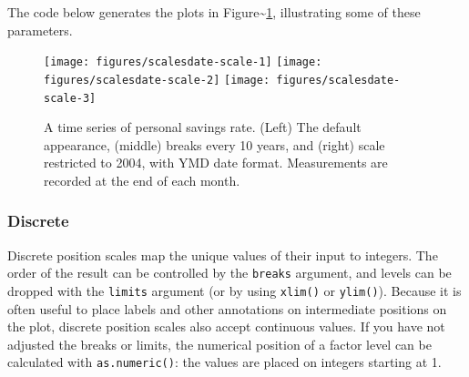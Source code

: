 The code below generates the plots in
Figure\textasciitilde{}\ref{fig:date-scale}, illustrating some of these
parameters.

\begin{Shaded}
\end{Shaded}

\begin{figure}
\texttt{[image: figures/scalesdate-scale-1]} \texttt{[image: figures/scalesdate-scale-2]} \texttt{[image: figures/scalesdate-scale-3]} \caption{A time series of personal savings rate. (Left) The default appearance, (middle) breaks every 10 years, and (right) scale restricted to 2004, with YMD date format. Measurements are recorded at the end of each month.\label{fig:date-scale}}
\end{figure}

\subsubsection{Discrete}\label{ssub:scale-discrete}

Discrete position scales map the unique values of their input to
integers. The order of the result can be controlled by the
\texttt{breaks} argument, and levels can be dropped with the
\texttt{limits} argument (or by using \texttt{xlim()} or
\texttt{ylim()}). Because it is often useful to place labels and other
annotations on intermediate positions on the plot, discrete position
scales also accept continuous values. If you have not adjusted the
breaks or limits, the numerical position of a factor level can be
calculated with \texttt{as.numeric()}: the values are placed on integers
starting at 1. 
 

